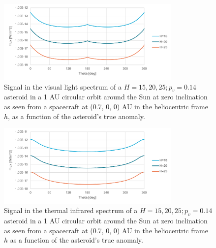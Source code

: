 \begin{figure}[htbp]
 \centering
 \includegraphics[width=0.8\textwidth]{img/implementation_vis_signal.pdf}
 \caption{Signal in the visual light spectrum of a $H=15, 20, 25; p_v=0.14$ asteroid in a 1 AU circular orbit around the Sun at zero inclination as seen from a spacecraft at (0.7, 0, 0) AU in the heliocentric frame $h$, as a function of the asteroid's true anomaly.}
 \label{fig:visual_signal_implementation}
\end{figure}


\begin{figure}[htbp]
 \centering
 \includegraphics[width=0.8\textwidth]{img/implementation_tir_signal.pdf}
 \caption{Signal in the thermal infrared spectrum of a $H=15, 20, 25; p_v=0.14$ asteroid in a 1 AU circular orbit around the Sun at zero inclination as seen from a spacecraft at (0.7, 0, 0) AU in the heliocentric frame $h$ as a function of the asteroid's true anomaly.}
 \label{fig:thermal_signal_implementation}
\end{figure}

